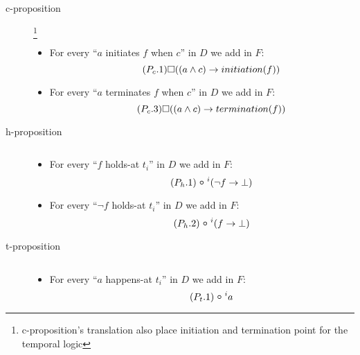 \begin{description}
  \item[c-proposition]\footnote{c-proposition's translation also place initiation and termination point for the temporal logic}
  \begin{itemize}
    \item For every “$a$ initiates $f$ when $c$” in $D$ we add in $F$:
    \begin{equation}\tag{$P_c.1$}
      \square((a\land c)\rightarrow initiation(f))
    \end{equation}
    \item For every “$a$ terminates $f$ when $c$” in $D$ we add in $F$:
    \begin{equation}\tag{$P_c.3$}
      \square((a\land c)\rightarrow termination(f))
    \end{equation}
  \end{itemize}
  \item[h-proposition] $ $
  \begin{itemize}
    \item For every “$f$ holds-at $t_i$” in $D$ we add in $F$:
    \begin{equation}\tag{$P_h.1$}
      \next^{i}(\neg f\rightarrow \bot)
    \end{equation}
    \item For every “$\neg f$ holds-at $t_i$” in $D$ we add in $F$:
    \begin{equation}\tag{$P_h.2$}
      \next^{i}(f\rightarrow \bot)
    \end{equation}
  \end{itemize}
  \item[t-proposition] $ $
  \begin{itemize}
    \item For every “$a$ happens-at $t_i$” in $D$ we add in $F$:
    \begin{equation}\tag{$P_t.1$}
      \next^{i}a
    \end{equation}
  \end{itemize}
\end{description}

